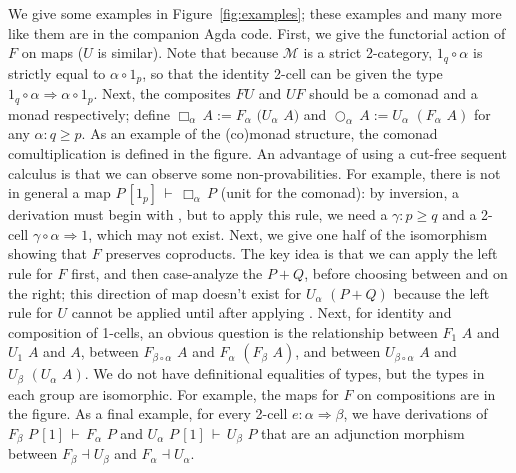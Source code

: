 \documentclass{drl-common/llncs}
\newcommand{\M}{\ensuremath{\mathcal{M}}}
\newcommand{\la}{\ensuremath{\dashv}}
\newcommand{\tc}[2]{\ensuremath{#1 \Rightarrow #2}}
\newcommand\compo[2]{\ensuremath{#1 \circ #2}}
\newcommand\F[2]{\ensuremath{F_{#1} \,\, #2}}
\newcommand\U[2]{\ensuremath{U_{#1} \,\, #2}}
\newcommand\coprd[2]{\ensuremath{#1 + #2}}
\newcommand\seq[3]{\ensuremath{#1 \, [ #2 ] \, \vdash \, #3}}
\renewcommand\irl[1]{\dsd{#1}}
\newcommand\Bx[2]{\ensuremath{\Box_{#1} \, {#2}}}
\newcommand\Crc[2]{\ensuremath{\bigcirc_{#1} \, {#2}}}
\begin{document}
We give some examples in Figure~\ref{fig:examples}; these examples and
many more like them are in the companion Agda code.  First, we give the
functorial action of $F$ on maps ($U$ is similar).  Note that because
\M\/ is a strict 2-category, $\compo{1_q} \alpha$ is strictly equal to $\compo {\alpha} {1_p}$, so that
the identity 2-cell can be given the type
\tc{\compo{1_q} \alpha}{\compo {\alpha} {1_p}}.  Next, the composites
$FU$ and $UF$ should be a comonad and a monad respectively; define $\Bx
\alpha A := \F \alpha (\U \alpha A)$ and $\Crc{\alpha}A :=
\U{\alpha}{(\F{\alpha}{A})}$ for any $\alpha : q \ge p$.  As an example
of the (co)monad structure, the comonad comultiplication is defined in
the figure.  An advantage of using a cut-free sequent calculus is that
we can observe some non-provabilities.  For example, there is not in
general a map \seq{P}{1_p}{\Bx{\alpha}{P}} (unit for the comonad): by
inversion, a derivation must begin with \irl{FR}, but to apply this
rule, we need a $\gamma : p \ge q$ and a 2-cell
$\tc{\compo{\gamma}{\alpha}}{1}$, which may not exist.  Next, we give
one half of the isomorphism showing that $F$ preserves coproducts.  The
key idea is that we can apply the left rule for $F$ first, and then
case-analyze the $\coprd{P}{Q}$, before choosing between \irl{Inl} and
\irl{Inr} on the right; this direction of map doesn't exist for
\U{\alpha}{(\coprd{P}{Q})} because the left rule for $U$ cannot be
applied until after applying \irl{UR}.  Next, for identity and
composition of 1-cells, an obvious question is the relationship between
$\F 1 A$ and $\U 1 A$ and $A$, between $\F {\compo{\beta}{\alpha}} A$
and $\F \alpha {(\F \beta A)}$, and between $\U {\compo{\beta}{\alpha}}
A$ and $\U \beta {(\U \alpha A)}$.  We do not have definitional
equalities of types, but the types in each group are isomorphic.  For
example, the maps for $F$ on compositions are in the figure.  As a final
example, for every 2-cell $e : \tc \alpha \beta$, we have derivations of
\seq{\F \beta P}{1}{\F \alpha P} and \seq{\U \alpha P}{1}{\U \beta P}
that are an adjunction morphism between $F_\beta \la U_\beta$ and
$F_\alpha \la U_\alpha$.
\end{document}
